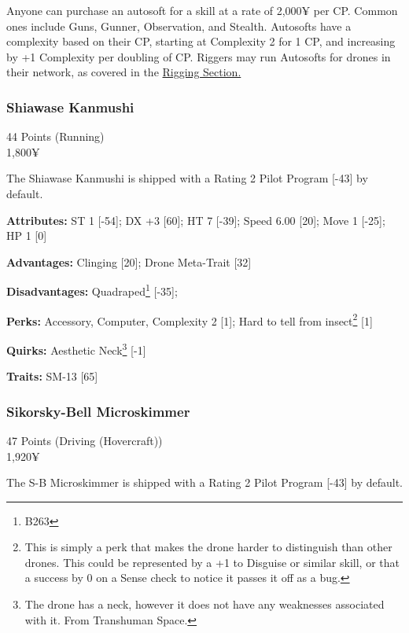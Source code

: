 Anyone can purchase an autosoft for a skill at a rate of 2,000¥ per CP. Common ones include Guns, Gunner, Observation, and Stealth. Autosofts have a complexity based on their CP, starting at Complexity 2 for 1 CP, and increasing by +1 Complexity per doubling of CP. Riggers may run Autosofts for drones in their network, as covered in the \hyperref[rigger_rules]{Rigging Section.}



\begin{multicols*}{2}
	
	\subsubsection{Shiawase Kanmushi}
	\begin{flushright}
		44 Points (Running)\\
		1,800¥
	\end{flushright}
	
	The Shiawase Kanmushi is shipped with a Rating 2 Pilot Program [-43] by default.
	
	\textbf{Attributes:} 
	ST 1 [-54]; DX +3 [60]; HT 7 [-39];
	Speed 6.00 [20]; Move 1 [-25]; HP 1 [0]
	
	\textbf{Advantages:} 
	Clinging [20]; Drone Meta-Trait [32]
	
	\textbf{Disadvantages:} 
	Quadraped\footnote{B263} [-35];
	
	\textbf{Perks:}
	Accessory, Computer, Complexity 2 [1]; Hard to tell from insect\footnote{This is simply a perk that makes the drone harder to distinguish than other drones. This could be represented by a +1 to Disguise or similar skill, or that a success by 0 on a Sense check to notice it passes it off as a bug.} [1]
	
	\textbf{Quirks:}
	Aesthetic Neck\footnote{The drone has a neck, however it does not have any weaknesses associated with it. From Transhuman Space.} [-1]
	
	\textbf{Traits:}
	SM-13 [65]	
	
	\subsubsection{Sikorsky-Bell Microskimmer}
	\begin{flushright}
		47 Points (Driving (Hovercraft))\\
		1,920¥
	\end{flushright}
	
	The S-B Microskimmer is shipped with a Rating 2 Pilot Program [-43] by default.
	

\end{multicols*}
